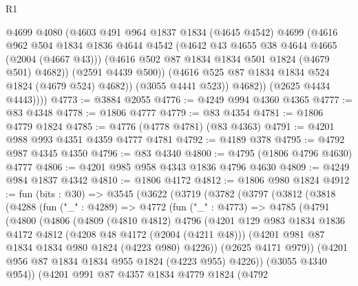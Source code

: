 \begin{lexlean}{R1}
\begin{coremodule}
                  @4699
                  @4080
                  (@4603
                    @491
                    @964
                    @1837
                    @1834
                    (@4645 @4542)
                    @4699
                    (@4616
                      @962
                      @504
                      @1834
                      @1836
                      @4644
                      @4542
                      (@4642 @43 @4655 @38 @4644 @4665 (@2004 (@4667 @43)))
                      (@4616 @502 @87 @1834 @1834 @501 @1824 (@4679 @501) @4682))
                    (@2591 @4439 @500))
                  (@4616 @525 @87 @1834 @1834 @524 @1824 (@4679 @524) @4682))
                (@3055 @4441 @523))
              @4682))
          (@2625 @4434 @4443))))
@4773 := @3884 @2055
@4776 := @4249 @994 @4360 @4365
@4777 := @83 @4348
@4778 := @1806 @4777
@4779 := @83 @4354
@4781 := @1806 @4779 @1824
@4785 := @4776 (@4778 @4781) (@83 @4363)
@4791 := @4201 @988 @993 @4351 @4359 @4777 @4781
@4792 := @4189 @378
@4795 := @4792 @987 @4345 @4350
@4796 := @83 @4340
@4800 := @4795 (@1806 @4796 @4630) @4777
@4806 := @4201 @985 @958 @4343 @1836 @4796 @4630
@4809 := @4249 @984 @1837 @4342
@4810 := @1806 @4172
@4812 := @1806 @980 @1824
@4912 := fun (bits : @30) =>
  @3545
    (@3622
      (@3719
        (@3782
          (@3797
            (@3812
              (@3818
                (@4288
                  (fun ("_" : @4289) =>
                  @4772
                    (fun ("_" : @4773) =>
                    @4785
                      (@4791
                        (@4800
                          (@4806
                            (@4809
                              (@4810 @4812)
                              @4796
                              (@4201
                                @129
                                @983
                                @1834
                                @1836
                                @4172
                                @4812
                                (@4208 @48 @4172 (@2004 (@4211 @48)))
                                (@4201 @981 @87 @1834 @1834 @980 @1824 (@4223 @980) @4226))
                              (@2625 @4171 @979))
                            (@4201 @956 @87 @1834 @1834 @955 @1824 (@4223 @955) @4226))
                          (@3055 @4340 @954))
                        (@4201
                          @991
                          @87
                          @4357
                          @1834
                          @4779
                          @1824
                          (@4792

\end{coremodule}
\end{lexlean}
